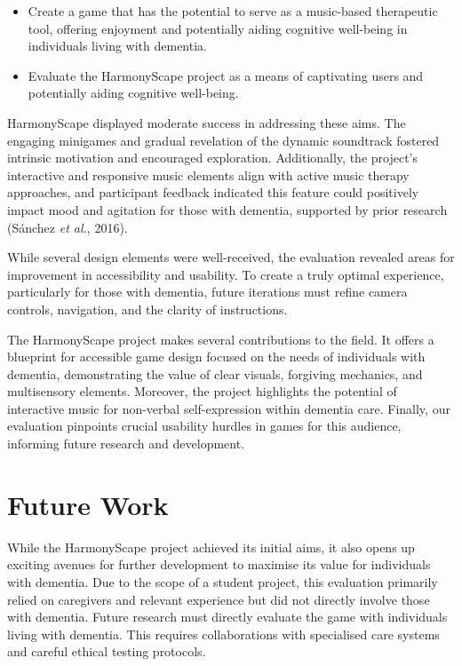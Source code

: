 \documentclass{l4proj}
\begin{document}
\begin{itemize}
    \item Create a game that has the potential to serve as a music-based therapeutic tool, offering enjoyment and potentially aiding cognitive well-being in individuals living with dementia.
    \item Evaluate the HarmonyScape project as a means of captivating users and potentially aiding cognitive well-being. 
\end{itemize}

HarmonyScape displayed moderate success in addressing these aims. The engaging minigames and gradual revelation of the dynamic soundtrack fostered intrinsic motivation and encouraged exploration. Additionally, the project's interactive and responsive music elements align with active music therapy approaches, and participant feedback indicated this feature could positively impact mood and agitation for those with dementia, supported by prior research (Sánchez \emph{et al.}, 2016).

While several design elements were well-received, the evaluation revealed areas for improvement in accessibility and usability. To create a truly optimal experience, particularly for those with dementia, future iterations must refine camera controls, navigation, and the clarity of instructions.

The HarmonyScape project makes several contributions to the field. It offers a blueprint for accessible game design focused on the needs of individuals with dementia, demonstrating the value of clear visuals, forgiving mechanics, and multisensory elements. Moreover, the project highlights the potential of interactive music for non-verbal self-expression within dementia care. Finally, our evaluation pinpoints crucial usability hurdles in games for this audience, informing future research and development.

\section{Future Work}

While the HarmonyScape project achieved its initial aims, it also opens up exciting avenues for further development to maximise its value for individuals with dementia. Due to the scope of a student project, this evaluation primarily relied on caregivers and relevant experience but did not directly involve those with dementia. Future research must directly evaluate the game with individuals living with dementia. This requires collaborations with specialised care systems and careful ethical testing protocols.
\end{document}
